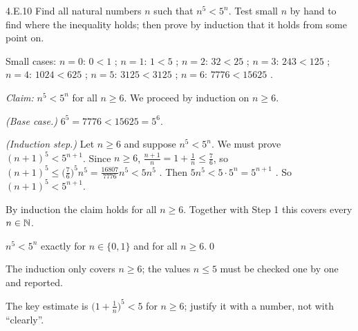 
\begin{bookex}[essential]{4.E.10}
Find all natural numbers $n$ such that $n^5<5^n$.
\solution
\plan Test small $n$ by hand to find where the inequality holds; then prove by induction that it holds from some point on.
\begin{steps}
\item Small cases: $n=0$: $0<1$ \tick; $n=1$: $1<5$ \tick; $n=2$: $32<25$ \cross; $n=3$: $243<125$ \cross; $n=4$: $1024<625$ \cross; $n=5$: $3125<3125$ \cross; $n=6$: $7776<15625$ \tick.
\item \emph{Claim:} $n^5<5^n$ for all $n\ge6$. We proceed by induction on $n\ge6$.
\item \emph{(Base case.)} $6^5=7776<15625=5^6$.
\item \emph{(Induction step.)} Let $n\ge6$ and suppose $n^5<5^n$. We must prove $(n+1)^5<5^{n+1}$. Since $n\ge6$, $\frac{n+1}n=1+\frac1n\le\frac76$, so $(n+1)^5\le\big(\frac76\big)^5n^5=\frac{16807}{7776}n^5<5n^5$ . Then $5n^5<5\cdot5^n=5^{n+1}$ . So $(n+1)^5<5^{n+1}$.
\item By induction the claim holds for all $n\ge6$. Together with Step 1 this covers every $n\in\mathbb{N}$.
\end{steps}
\answer $n^5<5^n$ exactly for $n\in\{0,1\}$ and for all $n\ge6$.\qed
\begin{compare}
\item The induction only covers $n\ge6$; the values $n\le5$ must be checked one by one and reported.
\item The key estimate is $\big(1+\frac1n\big)^5<5$ for $n\ge6$; justify it with a number, not with ``clearly''.
\end{compare}
\end{bookex}

